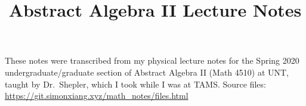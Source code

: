 \documentclass[fontsize=9pt]{article}
\title{Abstract Algebra II Lecture Notes}
\date{}
\begin{document}
\maketitle
These notes were transcribed from my physical lecture notes for the Spring 2020 undergraduate/graduate section of Abstract Algebra II (Math 4510) at UNT, taught by Dr.\ Shepler, which I took while I was at TAMS. Source files: \url{https://git.simonxiang.xyz/math_notes/files.html}

\tableofcontents
\newpage
    
    
    
    
    
    
    
    
    
    
    
    
    
    
    
    
    
    
    
     
\clearpage
\printbibliography
\end{document}
